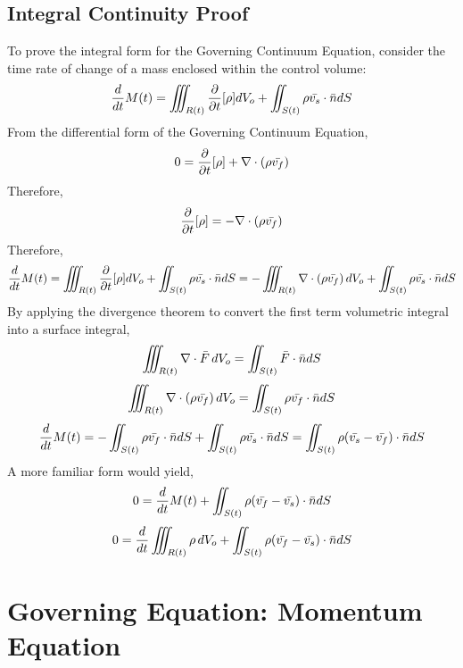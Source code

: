 \documentclass[class=report, 12pt, crop=false]{standalone}
\begin{document}
\begin{center}
\subsection{Integral Continuity Proof}
\begin{comment}
\end{comment}
To prove the integral form for the Governing Continuum Equation, consider the time rate of change of a mass enclosed within the control volume:
$$\frac{d}{dt} M(t) = \iiint_{R(t)}\frac{\partial}{\partial t}[\rho]dV_o + \iint_{S(t)}\rho\bar{v_s}\cdot\bar{n}dS$$
From the differential form of the Governing Continuum Equation, 
$$0 = \frac{\partial}{\partial t}[\rho] +  \nabla \cdot (\rho\bar{v_f})$$
Therefore,
$$\frac{\partial}{\partial t}[\rho] =  -\nabla \cdot (\rho\bar{v_f})$$
Therefore,
$$\frac{d}{dt} M(t) = \iiint_{R(t)}\frac{\partial}{\partial t}[\rho]dV_o + \iint_{S(t)}\rho\bar{v_s}\cdot\bar{n}dS = -\iiint_{R(t)}\nabla \cdot (\rho\bar{v_f})\,dV_o + \iint_{S(t)}\rho\bar{v_s}\cdot\bar{n}dS$$
By applying the divergence theorem to convert the first term volumetric integral into a surface integral,
$$\iiint_{R(t)}  \nabla \cdot \bar{F} \,dV_o = \iint_{S(t)}\bar{F}\cdot \bar{n}dS$$
$$\iiint_{R(t)}  \nabla \cdot (\rho\bar{v_f}) \,dV_o = \iint_{S(t)}\rho\bar{v_f}\cdot \bar{n}dS$$
$$\frac{d}{dt} M(t) = -\iint_{S(t)}\rho\bar{v_f}\cdot\bar{n}dS + \iint_{S(t)}\rho\bar{v_s}\cdot\bar{n}dS = \iint_{S(t)}\rho(\bar{v_s} -\bar{v_f})\cdot\bar{n}dS$$
A more familiar form would yield,
$$0 = \frac{d}{dt} M(t) + \iint_{S(t)}\rho(\bar{v_f} - \bar{v_s})\cdot\bar{n}dS$$
$$0 = \frac{d}{dt}\iiint_{R(t)} \rho \,dV_o + \iint_{S(t)}\rho(\bar{v_f} - \bar{v_s})\cdot\bar{n}dS$$
\section{Governing Equation: Momentum Equation}
\begin{comment}
Governing Equation: Momentum Equation

More information should be shed on the the part of \rho \b{v_f}\b{v_s} \d \b{n}dS. What does this even mean, there are two vectors so how does the order of operations work in this case?

More information should also be used in the case of \nabla \d (\rho \b{v_f}\b{v_s}). Again, can chain rule be applied to nabla \cdot operation? How is the \nabla \d (\rho \b{v_f}\b{v_s}) computed?

Derivations on the Tensor part, proving that the integral of the body force and the surface force yielding -\nabla P_r + \nabla \d \tau + \rho \b{F_b} has not been proven.


\end{comment}
\end{center}
\end{document}
